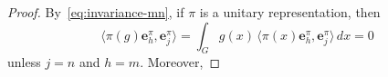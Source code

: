 \documentclass[12pt,a4paper]{amsart}
\theoremstyle{definition}
\theoremstyle{remark}
\numberwithin{equation}{section}
\newcommand{\R}{\mathbb{R}}
\newcommand{\Discr}{\mathbb{D}_m}
\newcommand{\eb}{\mathbf{e}}
\newcommand{\var}{s}
\begin{document}
\begin{proof}
%
%
By~\eqref{eq:invariance-mn}, if $\pi$ is a unitary representation, then
\[
\langle \pi(g)\eb^\pi_h,\eb^\pi_j\rangle=\int_G g(x)\, \langle \pi(x)\eb^\pi_h,\eb^\pi_j\rangle\, dx=0
\]
unless  $j=n$ and $h=m$. Moreover, 

\end{proof}
\end{document}
